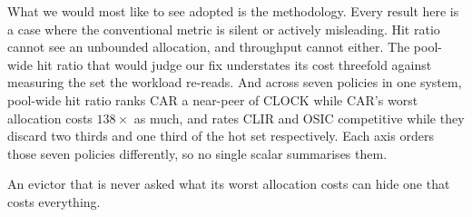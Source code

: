 \documentclass[sigconf,nonacm]{acmart}
\begin{document}
What we would most like to see adopted is the methodology. Every result here
is a case where the conventional metric is silent or actively misleading. Hit
ratio cannot see an unbounded allocation, and throughput cannot either. The
pool-wide hit ratio that would judge our fix understates its cost threefold
against measuring the set the workload re-reads. And across seven policies in
one system, pool-wide hit ratio ranks CAR a near-peer of CLOCK while CAR's
worst allocation costs $138\times$ as much, and rates CLIR and OSIC
competitive while they discard two thirds and one third of the hot set
respectively. Each axis orders those seven policies differently, so no single
scalar summarises them.

An evictor that is never asked what its worst allocation costs can hide one
that costs everything.



\end{document}
